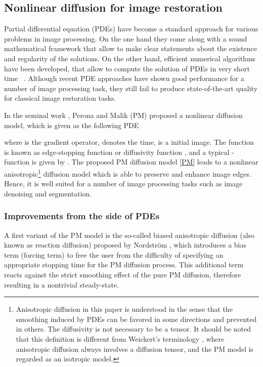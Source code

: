 \documentclass[10pt,journal,compsoc]{IEEEtran}
\begin{document}
\subsection{Nonlinear diffusion for image restoration}\label{intro} {
  Partial differential equation (PDEs) have become a standard approach
  for various problems in image processing. On the one hand they come
  along with a sound mathematical framework that allow to make clear
  statements about the existence and regularity of the solutions. On
  the other hand, efficient numerical algorithms have been developed,
  that allow to compute the solution of PDEs in very short
  time~\cite{PMmodel, anisotropicbook} . Although recent PDE approaches
  have shown good performance for a number of image processing task,
  they still fail to produce state-of-the-art quality for classical
  image restoration tasks.

\begin{comment}
Unfortunately, the image restoration quality of diffusion based approaches is usually 
far away from state-of-the-art algorithms for specific tasks, 
even though many improvements
\cite{hajiaboli2011anisotropic, 
didas2009properties, guidotti2011two}.
We give a brief review of nonlinear diffusion based approaches and then introduce our proposed diffusion model. 
\end{comment}
In the seminal work \cite{PMmodel}, Perona and Malik (PM) proposed a 
nonlinear diffusion model, which is given as the following PDE

{where  is the gradient operator,  denotes the time,  is 
  a initial image.} The function  is known as edge-stopping function
\cite{ROBUSTANISOTROPIC} or diffusivity function \cite{anisotropicbook}, and 
a typical -function is given by . 
The proposed PM diffusion model \eqref{PM} leads to a 
nonlinear anisotropic\footnote{
  Anisotropic diffusion in this paper is understood in the sense that 
  the smoothing induced by PDEs can be favored in some directions and 
  prevented in others. The diffusivity is not 
  necessary to be a tensor. It should be noted that this definition is different from Weickert's terminology \cite{anisotropicbook}, 
  where anisotropic diffusion always involves a diffusion tensor, and the PM model is regarded as an isotropic model.}
diffusion model which is able to preserve and enhance image edges.
Hence, it is well suited for a number of image processing tasks such as image denoising and segmentation. 

\subsubsection{Improvements from the side of PDEs}\label{sec:pdes}
A first variant of the PM model is the so-called biased anisotropic diffusion 
(also known as reaction diffusion) proposed by Nordstr{\"o}m \cite{biased}, which introduces a bias term (forcing term) to 
free the user from the difficulty of specifying an appropriate stopping time for the PM diffusion process. 
This additional term reacts against the strict smoothing effect of the pure PM diffusion, therefore resulting in a nontrivial steady-state. 

}
\end{document}
